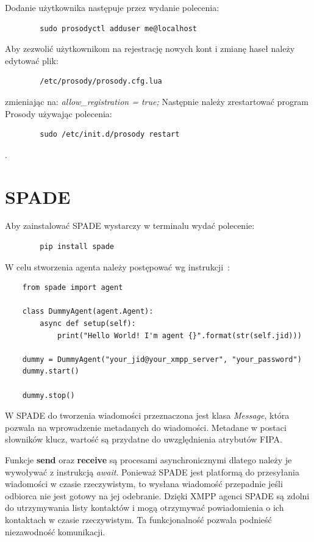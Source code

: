 \documentclass[11pt]{report}
\begin{document}
    Dodanie użytkownika następuje przez wydanie polecenia:
    \begin{verbatim}
        sudo prosodyctl adduser me@localhost
    \end{verbatim}

    Aby zezwolić użytkownikom na rejestrację nowych kont i zmianę haseł należy edytować plik:
    \begin{verbatim}
        /etc/prosody/prosody.cfg.lua
    \end{verbatim}
    zmieniając na: \textit{allow\_registration = true;}
    Następnie należy zrestartować program Prosody używając polecenia:
    \begin{verbatim}
        sudo /etc/init.d/prosody restart
    \end{verbatim}.


    \section{SPADE}

    Aby zainstalować SPADE wystarczy w terminalu wydać polecenie:
    \begin{verbatim}
        pip install spade
    \end{verbatim}

    W celu stworzenia agenta należy postępować wg instrukcji~\cite{SPADEquickstart}:
    \begin{verbatim}
    from spade import agent

    class DummyAgent(agent.Agent):
        async def setup(self):
            print("Hello World! I'm agent {}".format(str(self.jid)))

    dummy = DummyAgent("your_jid@your_xmpp_server", "your_password")
    dummy.start()

    dummy.stop()
    \end{verbatim}

    W SPADE do tworzenia wiadomości przeznaczona jest klasa \textit{Message},
    która pozwala na wprowadzenie metadanych do wiadomości.
    Metadane w postaci słowników klucz, wartość są przydatne do uwzględnienia atrybutów FIPA\@.

    Funkcje \textbf{send} oraz \textbf{receive} są procesami asynchronicznymi dlatego należy je wywoływać z instrukcją \textit{await}.
    Ponieważ SPADE jest platformą do przesyłania wiadomości w czasie rzeczywistym,
    to wysłana wiadomość przepadnie jeśli odbiorca nie jest gotowy na jej odebranie.
    Dzięki XMPP agenci SPADE są zdolni do utrzymywania listy kontaktów i mogą otrzymywać powiadomienia o ich kontaktach w czasie rzeczywistym.
    Ta funkcjonalność pozwala podnieść niezawodność komunikacji.
\end{document}
